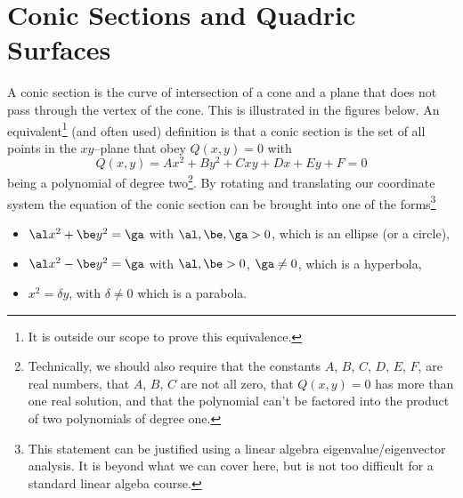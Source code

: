 \graphicspath{{figs_quadric/}}

\renewcommand{\theequation}{\thechapter.\arabic{equation}}
\renewcommand{\thetheorem}{\thechapter.\arabic{theorem}}
\renewcommand{\thebc}{\thechapter.\arabic{theorem}}
\renewcommand{\theeg}{\thechapter.\arabic{theorem}}


\chapter{Conic Sections and Quadric Surfaces}\label{ap:quadric}

A conic section is the curve of intersection of a cone and a plane
that does not pass through the vertex of the cone.
This is illustrated in the figures below.
An equivalent\footnote{It is outside our scope to prove this equivalence.} 
(and often used) definition is that a conic section is the set of all points  
in the $xy$--plane that obey $Q(x,y)=0$ with
\begin{equation*}
Q(x,y) = Ax^2 + By^2 + Cxy + Dx + Ey + F =0
\end{equation*}
being a polynomial of degree two\footnote{Technically, we should also require
that the constants $A$, $B$, $C$, $D$, $E$, $F$, are real numbers,
that $A$, $B$, $C$ are not all zero, that $Q(x,y)=0$ has more than one 
real solution, and that the polynomial can't be factored
into the product of two polynomials of degree one.}.
By rotating and translating  our coordinate system the equation of the conic section can be brought
into one of the forms\footnote{This statement can be justified using a 
linear algebra eigenvalue/eigenvector analysis. It is 
beyond what we can cover here, but is not too difficult for a standard 
linear algeba course.}
\begin{itemize}
\item
$\al x^2 + \be y^2 =\ga$ with $\al,\be,\ga >0$, which is an ellipse
(or a circle),
\item
$\al x^2 - \be y^2 =\ga$ with $\al,\be>0$, $\ga\ne0$, which is a hyperbola,
\item 
$x^2 = \delta y$, with $\delta\ne 0$ which is a parabola.
\end{itemize}
\goodbreak

